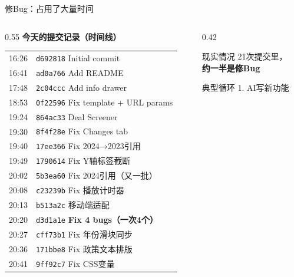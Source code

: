 \documentclass[aspectratio=169,11pt]{beamer}
\begin{document}
\begin{frame}{修Bug：占用了大量时间}

  \begin{columns}[T]
    \begin{column}{0.55\linewidth}
      \textbf{今天的提交记录（时间线）}\\[0.5em]
      {\small
      \begin{tabular}{ll}
        16:26 & \texttt{d692818} Initial commit \\
        16:41 & \texttt{ad0a766} Add README \\
        17:48 & \texttt{2c04ccc} Add info drawer \\
        18:53 & \texttt{0f22596} Fix template + URL params \\
        19:24 & \texttt{864ac33} Deal Screener \\
        19:30 & \texttt{8f4f28e} Fix Changes tab \\
        19:40 & \texttt{17ee366} Fix 2024→2023引用 \\
        19:49 & \texttt{1790614} Fix Y轴标签截断 \\
        20:02 & \texttt{5b3ea60} Fix 2024引用（又一批）\\
        20:08 & \texttt{c23239b} Fix 播放计时器 \\
        20:13 & \texttt{b513a2c} 移动端适配 \\
        \color{prismclay}20:20 & \color{prismclay}\texttt{d3d1a1e} \textbf{Fix 4 bugs（一次4个）}\\
        20:27 & \texttt{cff73b1} Fix 年份滑块同步 \\
        20:36 & \texttt{171bbe8} Fix 政策文本排版 \\
        20:41 & \texttt{9ff92c7} Fix CSS变量 \\
      \end{tabular}
      }
    \end{column}
    \begin{column}{0.42\linewidth}
      \vspace{0.5em}
      \begin{alertblock}{现实情况}
        21次提交里，\\
        \textbf{约一半是修Bug}
      \end{alertblock}
      \vspace{0.5em}
      \begin{block}{典型循环}
        \small
        1. AI写新功能\\

\end{block}
\end{column}
\end{columns}
\end{frame}
\end{document}
